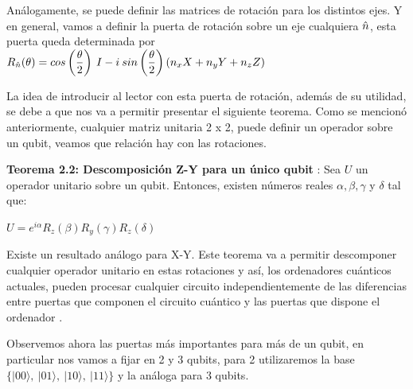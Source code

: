  Análogamente, se puede definir las matrices de rotación para los distintos ejes. Y en general, vamos a definir la puerta de rotación sobre un eje cualquiera $\Hat{n}$, esta puerta queda determinada por $R_{\Hat{n}}(\theta) = cos \left(\dfrac{\theta}{2}\right)\:I - i\:sin\left(\dfrac{\theta}{2}\right)\left(n_{x}X + n_{y}Y + n_{z}Z\right) $ \newline

 La idea de introducir al lector con esta puerta de rotación, además de su utilidad, se debe a que nos va a permitir presentar el siguiente teorema. Como se mencionó anteriormente, cualquier matriz unitaria 2 x 2, puede definir un operador sobre un qubit, veamos que relación hay con las rotaciones. \newline
 
 \textbf{Teorema 2.2: Descomposición Z-Y para un único qubit} \cite{B:Nielsen:2002}: Sea $U$ un operador unitario sobre un qubit. Entonces, existen números reales $\alpha,\beta,\gamma$ y $\delta$ tal que:
 \begin{center}
     $U = e^{i\alpha} R_{z}(\beta)R_{y}(\gamma)R_{z}(\delta)$
 \end{center}

 Existe un resultado análogo para X-Y. Este teorema va a permitir descomponer cualquier operador unitario en estas rotaciones y así, los ordenadores cuánticos actuales, pueden procesar cualquier circuito independientemente de las diferencias entre puertas que componen el circuito cuántico y las puertas que dispone el ordenador \cite{Note:Martin}. \newline

 Observemos ahora las puertas más importantes para más de un qubit, en particular nos vamos a fijar en 2 y 3 qubits, para 2 utilizaremos la base $\{|00\rangle,\:|01\rangle,\:|10\rangle,\:|11\rangle\}$ y la análoga para 3 qubits.

